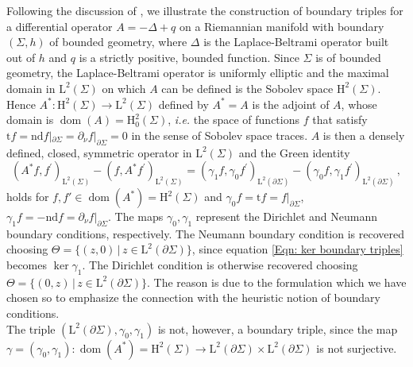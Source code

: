 \begin{Example}
 	Following the discussion of \cite[Sec. 2.2]{Dappiaggi-Drago-Ferreira-19}, we illustrate the construction of boundary triples for a differential operator $A=-\Delta+q$ on a Riemannian manifold with boundary $(\Sigma,h)$ of bounded geometry, where $\Delta$ is the Laplace-Beltrami operator built out of $h$ and $q$ is a strictly positive, bounded function. Since $\Sigma$ is of bounded geometry, the Laplace-Beltrami operator is uniformly elliptic and the maximal domain in $\mathrm{L}^2(\Sigma)$ on which $A$ can be defined is the Sobolev space $\mathrm{H}^2(\Sigma)$. Hence $A^*:\mathrm{H}^2(\Sigma)\to \mathrm{L}^2(\Sigma)$ defined by $A^*=A$ is the adjoint of $A$, whose domain is $\operatorname{dom}(A)=\mathrm{H}^2_0(\Sigma)$, \emph{i.e.} the space of functions $f$ that satisfy $\mathrm{t}f=\mathrm{n}\mathrm{d}f|_{\partial \Sigma}=\partial_\nu f|_{\partial \Sigma}=0$ in the sense of Sobolev space traces. $A$ is then a densely defined, closed, symmetric operator in $\mathrm{L}^2(\Sigma)$ and the Green identity
	\begin{equation}
		(A^*f,f^\prime)_{\mathrm{L}^2(\Sigma)}-(f,A^*f^\prime)_{\mathrm{L}^2(\Sigma)}=(\gamma_1 f,\gamma_0 f^\prime)_{\mathrm{L}^2(\partial \Sigma)}-(\gamma_0 f,\gamma_1 f^\prime)_{\mathrm{L}^2(\partial \Sigma)}\,,
	\end{equation}
	holds for $f,f'\in\operatorname{dom}(A^*)=\mathrm{H}^2(\Sigma)$ and $\gamma_0 f=\mathrm{t}f=f|_{\partial \Sigma}$, $\gamma_1 f=-\mathrm{n}\mathrm{d}f=\partial_\nu f|_{\partial \Sigma}$.
	The maps $\gamma_0,\gamma_1$ represent the Dirichlet and Neumann boundary conditions, respectively. The Neumann boundary condition is recovered choosing $\Theta=\{	(z,0)\,|\,z\in\mathrm{L}^2(\partial \Sigma)	\}$, since equation \eqref{Eqn: ker boundary triples} becomes $\ker\gamma_{1}$. The Dirichlet condition is otherwise recovered choosing $\Theta=\{	(0,z)\,|\,z\in\mathrm{L}^2(\partial \Sigma)	\}$. The reason is due to the formulation which we have chosen so to emphasize the connection with the heuristic notion of boundary conditions.\\
	
	The triple $(\mathrm{L}^2(\partial \Sigma),\gamma_0,\gamma_1)$ is not, however, a boundary triple, since the map $\gamma=(\gamma_0,\gamma_1):\operatorname{dom}(A^*)=\mathrm{H}^2(\Sigma)\to \mathrm{L}^2(\partial \Sigma)\times \mathrm{L}^2(\partial \Sigma)$ is not surjective.
	

\end{Example}

